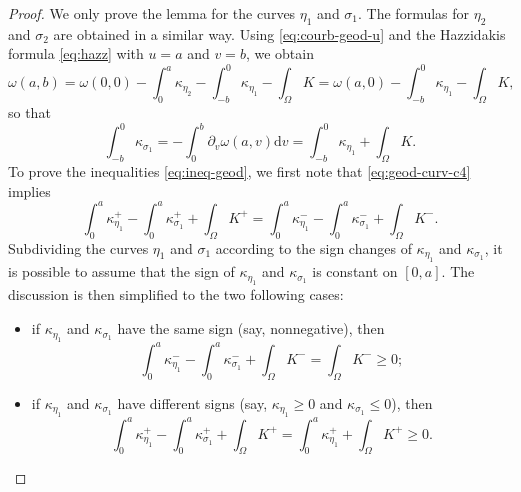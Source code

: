\documentclass{article}
\newcommand{\ko}{\kappa}
\newcommand{\DV}{\partial_{v}}
\newcommand{\dv}{\mathrm{d}v}
\theoremstyle{remark}
\theoremstyle{prpart}
\begin{document}
\begin{proof}
  We only prove the lemma for the curves $\eta_1$ and $\sigma_1$. The formulas for $\eta_2$ and $\sigma_2$ are obtained in a similar way. Using \eqref{eq:courb-geod-u} and the Hazzidakis formula \eqref{eq:hazz} with $u=a$ and $v=b$, we obtain
  \begin{equation*}
    \omega(a,b) = \omega(0,0) - \int_0^a\ko_{\eta_2} - \int_{-b}^0\ko_{\eta_1} - \int_{\Omega}K 
                  =\omega(a,0) - \int_{-b}^0\ko_{\eta_1} - \int_{\Omega}K,
\end{equation*}
so that
\begin{equation*}
   \int_{-b}^0\ko_{\sigma_1} = - \int_0^b\DV\omega(a,v)\dv = \int_{-b}^0\ko_{\eta_1} + \int_{\Omega}K.
  \end{equation*} 
  To prove the inequalities \eqref{eq:ineq-geod}, we first note that \eqref{eq:geod-curv-c4} implies 
  \begin{equation*}
    \int_0^a{\ko_{\eta_1}^+} - \int_0^a{\ko_{\sigma_1}^+} + \int_{\Omega}{K^+} = \int_0^a{\ko_{\eta_1}^-} - \int_0^a{\ko_{\sigma_1}^-} + \int_{\Omega}{K^-}.
  \end{equation*}
  Subdividing the curves $\eta_1$ and $\sigma_1$ according to the sign changes of $\ko_{\eta_1}$ and $\ko_{\sigma_1}$, it is possible to assume that the sign of $\ko_{\eta_1}$ and $\ko_{\sigma_1}$ is constant on $[0,a]$. The discussion is then simplified to the two following cases:
  \begin{itemize}
  \item if $\ko_{\eta_1}$ and $\ko_{\sigma_1}$ have the same sign (say, nonnegative), then
    \begin{equation*}
      \int_0^a{\ko_{\eta_1}^-}-\int_0^a{\ko_{\sigma_1}^-}+\int_{\Omega}{K^-}=\int_{\Omega}{K^-}\geq 0;
    \end{equation*}
  \item if $\ko_{\eta_1}$ and $\ko_{\sigma_1}$ have different signs (say, $\ko_{\eta_1} \geq 0$ and $\ko_{\sigma_1}\leq 0$), then
    \begin{equation*}
      \int_0^a\ko_{\eta_1}^+-\int_0^a{\ko_{\sigma_1}^+} + \int_{\Omega}{K^+} = \int_0^a{\ko_{\eta_1}^+}+\int_{\Omega}{K^+}\geq 0.
    \end{equation*}
  \end{itemize}
\end{proof}
\end{document}

